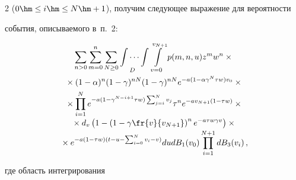 \begin{multicols}{2}
($0\hm\leq i \hm \leq N\hm+1$), получим следующее выражение для вероятности 


события, описываемого в~п.~2:





\vspace*{-4pt}





\noindent


  \begin{multline*}


  \sum\limits_{n>0} \sum\limits^n_{m=0} 


  \sum\limits_{N\geq0} \idotsint\limits_D 


\int\limits_{v=0}^{v_{N+1}} p(m,n,u) z^m w^n \times{}\\


{}\times (1-\alpha)^n (1-\gamma)^{nN} (1-\gamma)^{nN} e^{-a(1-\alpha\gamma^N \tau w)v_0} \times{}\\


  {}\times


\prod\limits^N_{i=1} e^{-a(1-\gamma^{N-i+1}\tau w)\sum\nolimits^N_{j=i} v_j} 


\tau^n e^{-av_{N+1} (1-\tau w)}\times{}\\[-2pt]


  {}\times  


d_v\left(1-\left( 1-\gamma\fr{v}{v_{N+1}}\right)^n e^{-a\tau w\gamma v}\right)\times{}\\[-2pt]


{}\times


e^{-a(1-\tau w) (t-u-\sum\nolimits^N_{i=0} v_i-v)}


du dB_1(v_0) \prod\limits_{i=1}^{N+1} dB_3(v_i)\,,


\end{multline*}





\vspace*{-6pt}





\noindent


где область интегрирования 





\vspace*{-3pt}






\end{multicols}

